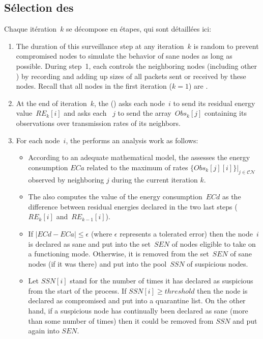 \subsection{Sélection des \cns}

Chaque itération~$k$ se décompose en étapes, qui sont détaillées ici:
\begin{enumerate}

    \item The duration of this surveillance step at any iteration~$k$ is random to prevent compromised nodes to simulate the behavior of sane nodes as long as possible.
        During step~1, each \cn controls the neighboring nodes (including other \cns) by recording and adding up sizes of all packets sent or received by these nodes.
        Recall that all nodes in the first iteration ($k=1$) are \cns.
    \item At the end of iteration~$k$, the \ch (\CH) asks each node~$i$ to send its residual energy value~$RE_k[i]$ and asks each \cn~$j$ to send the array~$Obs_k[j]$ containing its observations over transmission rates of its neighbors.
    \item For each node~$i$, the \ch performs an analysis work as follows:
        \begin{itemize}
            \item According to an adequate mathematical model, the \CH assesses the energy consumption $ECa$ related to the maximum of rates $\{Obs_k[j][i]\}|_{j\in \mathcal{CN}}$ observed by neighboring \cns $j$ during the current iteration $k$.
            \item The \CH also computes the value of the energy consumption~$ECd$ as the difference between residual energies declared in the two last steps (\ie~$RE_k[i]$ and~$RE_{k-1}[i]$).
            \item If $|ECd-ECa|\leq\epsilon$ (where $\epsilon$ represents a tolerated error) then the node~$i$ is declared as sane and put into the set~$SEN$ of nodes eligible to take on a \cn functioning mode.
                Otherwise, it is removed from the set~$SEN$ of sane nodes (if it was there) and put into the pool~$SSN$ of suspicious nodes.
            \item Let $SSN[i]$ stand for the number of times it has declared as suspicious from the start of the process.
                If $SSN[i]\ge threshold$ then the node is declared as compromised and put into a quarantine list.
                On the other hand, if a suspicious node has continually been declared as sane (more than some number of times) then it could be removed from $SSN$ and put again into $SEN$.

\end{itemize}
\end{enumerate}
